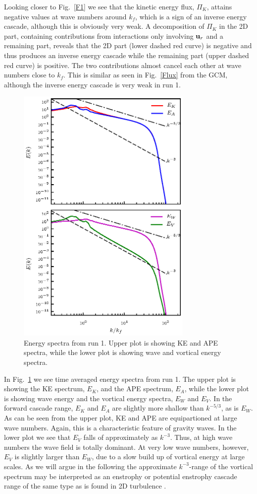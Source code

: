 Looking closer to Fig.~\ref{F1} we see that the kinetic energy flux, $ \Pi_K $, attains negative values at wave numbers around $ k_f $, which is a sign of an inverse energy cascade, although this is obviously very weak. A decomposition of  $ \Pi_K $ in the 2D part, containing contributions from interactions only involving $ {\bf u}_r $ and a remaining part, reveals that the 2D part (lower dashed red curve) is negative and thus produces an inverse energy cascade  while the remaining part (upper dashed red curve) is positive. The two contributions almost cancel each other at wave numbers close to $ k_f $. This is similar as seen in Fig.~\ref{Flux} from the GCM, although the inverse energy cascade is very weak in run 1.  

\begin{figure}[h]
\centerline{\includegraphics[angle=0,width=8.5cm]{./fig3.eps}}
 \caption{ Energy spectra from run 1. Upper plot is showing KE and APE spectra, while the lower plot is showing wave and vortical energy spectra. }
 \label{S1}
 \end{figure}
 
 
 In Fig.~\ref{S1} we see  time averaged energy spectra from run 1. The upper plot is
 showing the KE spectrum, $ E_K $,  and the APE spectrum, $ E_A$, while the lower plot
 is showing wave energy and the vortical energy spectra, $ E_W $ and $ E_V$.  In the
 forward cascade range, $ E_K $ and $ E_A $ are slightly more shallow than $ k^{-5/3} $,
 as is $ E_W $.  As can be seen from the upper plot, KE and APE are equipartioned at
 large wave numbers. Again, this is a characteristic feature of gravity waves. In the
 lower plot we see that $ E_V $  falls of approximately as $ k^{-3} $. Thus, at high
 wave numbers the wave field is totally dominant. At very low wave numbers, however, $
 E_V $ is slightly larger than $ E_W $, due to a slow build  up of vortical energy at
 large scales. { As we will argue in the following the approximate $ k^{-3} $-range of
 the vortical spectrum may be interpreted as an enstrophy or potential enstrophy cascade
 range of the same type as is found in 2D turbulence \citep{Kraichnan1967, Kraichnan1971}.}
 
